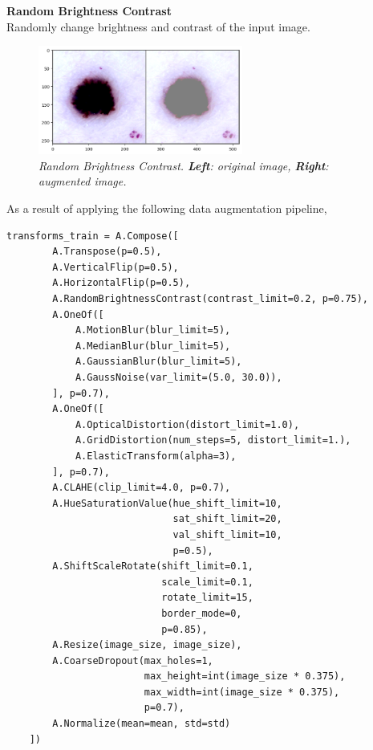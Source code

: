 \newpage

\textbf{Random Brightness Contrast} \\

Randomly change brightness and contrast of the input image.

\begin{figure}[H]
  \centering
  \includegraphics[width=0.6\textwidth]{imatges/methodological_contribution/random-brigness-constrast.png}
  \caption[Random Brightness Contrast]{\textit{Random Brightness Contrast. \textbf{Left}: original image, \textbf{Right}: augmented image. }}
\end{figure}

As a result of applying the following data augmentation pipeline,

\begin{Verbatim}[fontsize=\scriptsize]
    transforms_train = A.Compose([
        A.Transpose(p=0.5),
        A.VerticalFlip(p=0.5),
        A.HorizontalFlip(p=0.5),
        A.RandomBrightnessContrast(contrast_limit=0.2, p=0.75),
        A.OneOf([
            A.MotionBlur(blur_limit=5),
            A.MedianBlur(blur_limit=5),
            A.GaussianBlur(blur_limit=5),
            A.GaussNoise(var_limit=(5.0, 30.0)),
        ], p=0.7),
        A.OneOf([
            A.OpticalDistortion(distort_limit=1.0),
            A.GridDistortion(num_steps=5, distort_limit=1.),
            A.ElasticTransform(alpha=3),
        ], p=0.7),
        A.CLAHE(clip_limit=4.0, p=0.7),
        A.HueSaturationValue(hue_shift_limit=10,
                             sat_shift_limit=20,
                             val_shift_limit=10,
                             p=0.5),
        A.ShiftScaleRotate(shift_limit=0.1,
                           scale_limit=0.1,
                           rotate_limit=15,
                           border_mode=0,
                           p=0.85),
        A.Resize(image_size, image_size),
        A.CoarseDropout(max_holes=1,
                        max_height=int(image_size * 0.375),
                        max_width=int(image_size * 0.375),
                        p=0.7),
        A.Normalize(mean=mean, std=std)
    ])
\end{Verbatim}

